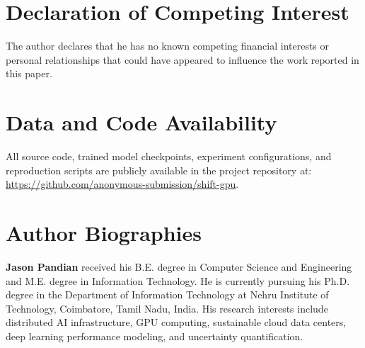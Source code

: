 \documentclass[3p,12pt]{elsarticle}
\begin{document}
\section*{Declaration of Competing Interest}
The author declares that he has no known competing financial interests or personal relationships that could have appeared to influence the work reported in this paper.

\section*{Data and Code Availability}
All source code, trained model checkpoints, experiment configurations, and reproduction scripts are publicly available in the project repository at: \url{https://github.com/anonymous-submission/shift-gpu}.

\section*{Author Biographies}

\noindent \textbf{Jason Pandian} received his B.E. degree in Computer Science and Engineering and M.E. degree in Information Technology. He is currently pursuing his Ph.D. degree in the Department of Information Technology at Nehru Institute of Technology, Coimbatore, Tamil Nadu, India. His research interests include distributed AI infrastructure, GPU computing, sustainable cloud data centers, deep learning performance modeling, and uncertainty quantification.



\end{document}
